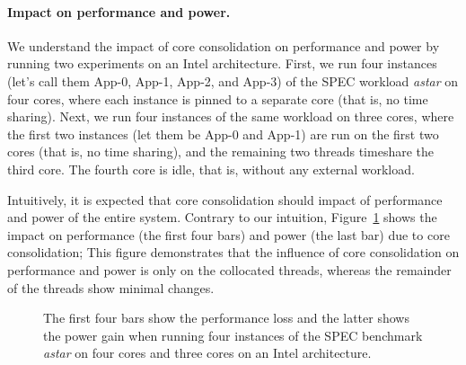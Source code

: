 \paragraph{Impact on performance and power.} 

We understand the impact of core consolidation on performance and power by running two
experiments on an Intel architecture.  First, we run four instances (let's call them
App-0, App-1, App-2, and App-3) of the SPEC workload \emph{astar} on four cores, where
each instance is pinned to a separate core (that is, no time sharing).  Next, we run four
instances of the same workload on three cores, where the first two instances (let them be
App-0 and App-1) are run on the first two cores (that is, no time sharing), and the
remaining two threads timeshare the third core. The fourth core is idle, that is, without
any external workload.

Intuitively, it is expected that core consolidation should impact of performance and power
of the entire system. Contrary to our intuition, Figure~\ref{fig: impactperfpower} shows
the impact on performance (the first four bars) and power (the last bar) due to core
consolidation; This figure demonstrates that the influence of core consolidation on
performance and power is only on the collocated threads, whereas the remainder of the
threads show minimal changes. %


\begin{figure}
    \centering
     \caption[Impact on performance and power due to core
    consolidation]{
    The first four bars show the performance loss and the latter shows the power gain when
    running four instances of the SPEC benchmark \emph{astar} on four cores and three
    cores on an Intel architecture.} \label{fig: impactperfpower} \end{figure}


